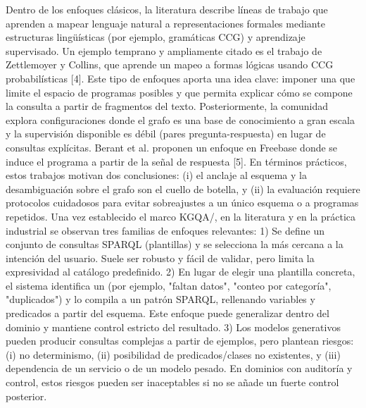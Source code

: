 {}\markdownRendererInterblockSeparator
{}Dentro de los enfoques clásicos, la literatura describe líneas de trabajo que aprenden a mapear lenguaje natural a representaciones formales mediante estructuras lingüísticas (por ejemplo, gramáticas CCG) y aprendizaje supervisado. Un ejemplo temprano y ampliamente citado es el trabajo de Zettlemoyer y Collins, que aprende un mapeo a formas lógicas usando CCG probabilísticas [4]. Este tipo de enfoques aporta una idea clave: imponer una  que limite el espacio de programas posibles y que permita explicar cómo se compone la consulta a partir de fragmentos del texto.\markdownRendererInterblockSeparator
{}Posteriormente, la comunidad explora configuraciones donde el grafo es una base de conocimiento a gran escala y la supervisión disponible es débil (pares pregunta-respuesta) en lugar de consultas explícitas. Berant et al. proponen un enfoque en Freebase donde se induce el programa a partir de la señal de respuesta [5]. En términos prácticos, estos trabajos motivan dos conclusiones: (i) el anclaje al esquema y la desambiguación sobre el grafo son el cuello de botella, y (ii) la evaluación requiere protocolos cuidadosos para evitar sobreajustes a un único esquema o a programas repetidos.\markdownRendererInterblockSeparator
{}\markdownRendererInterblockSeparator
{}Una vez establecido el marco KGQA/, en la literatura y en la práctica industrial se observan tres familias de enfoques relevantes:\markdownRendererInterblockSeparator
{}1)  Se define un conjunto de consultas SPARQL (plantillas) y se selecciona la más cercana a la intención del usuario. Suele ser robusto y fácil de validar, pero limita la expresividad al catálogo predefinido.\markdownRendererInterblockSeparator
{}2)  En lugar de elegir una plantilla concreta, el sistema identifica un  (por ejemplo, "faltan datos", "conteo por categoría", "duplicados") y lo compila a un patrón SPARQL, rellenando variables y predicados a partir del esquema. Este enfoque puede generalizar dentro del dominio y mantiene control estricto del resultado.\markdownRendererInterblockSeparator
{}3)  Los modelos generativos pueden producir consultas complejas a partir de ejemplos, pero plantean riesgos: (i) no determinismo, (ii) posibilidad de  predicados/clases no existentes, y (iii) dependencia de un servicio o de un modelo pesado. En dominios con auditoría y control, estos riesgos pueden ser inaceptables si no se añade un fuerte control posterior.\markdownRendererInterblockSeparator
